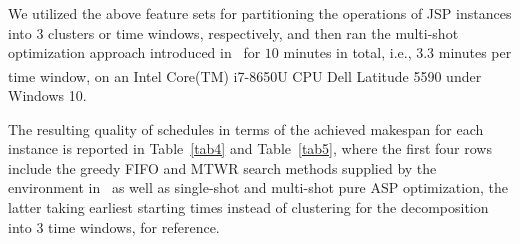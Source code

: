 \documentclass[runningheads]{llncs}
\begin{document}
We utilized the above feature sets for partitioning the operations of JSP instances into $3$ clusters or time windows, respectively,
and then ran the multi-shot optimization approach introduced in~\cite{el2020job} for
$10$ minutes in total, i.e., $3.3$ minutes per time window,
on an
Intel\textsuperscript{\textregistered} Core(TM) i7-8650U CPU\textsuperscript{\textregistered} Dell Latitude 5590 under Windows 10.

The resulting quality of schedules in terms of the achieved makespan for each instance is reported in Table~\ref{tab4} and Table~\ref{tab5},
where the first four rows include the greedy FIFO and MTWR search methods supplied by the environment in~\cite{tagesc21a}
as well as single-shot and multi-shot pure ASP optimization, the latter taking earliest starting times instead of 
clustering for the decomposition into $3$ time windows,
for reference.
\end{document}
